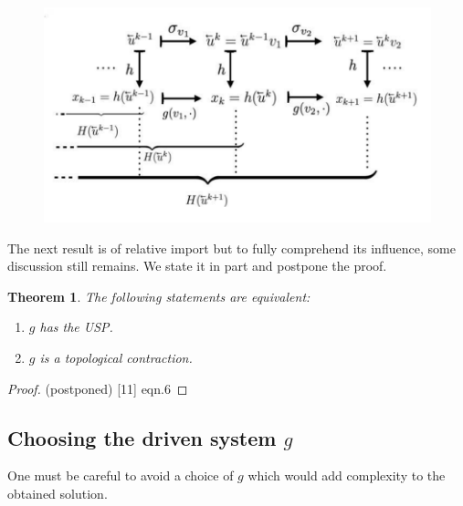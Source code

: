 \documentclass[12 pt]{article}
\newtheorem{Theorem}{Theorem}[]
\begin{document}
\begin{figure}[ht]
  \includegraphics[scale=0.3]{actionofh_H.png}
  \centering
  \label{fig:actionh_H}
\end{figure}

The next result is of relative import but to fully comprehend its influence, some discussion still remains. We state it in part and postpone the proof.

\begin{Theorem}
  The following statements are equivalent:
  \vspace{-8mm}
  \begin{enumerate}[noitemsep, label=\roman*.]
    \item $g$ has the USP. 
    \item $g$ is a topological contraction.
  \end{enumerate}
\end{Theorem}
\begin{proof}
  (postponed)  [11] eqn.6 
\end{proof}



\subsection {Choosing the driven system $g$}

One must be careful to avoid a choice of $g$ which would  add complexity to the obtained solution.  
\end{document}
